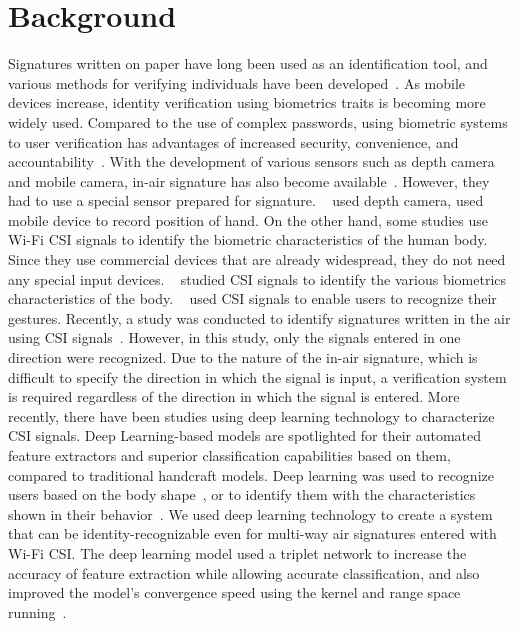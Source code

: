 \section{Background}
Signatures written on paper have long been used as an identification tool, and various methods for verifying individuals have been developed~\cite{fahmy2010online,galbally2015line,sanmorino2012survey,sesa2012information}.
As mobile devices increase, identity verification using biometrics traits is becoming more widely used.
Compared to the use of complex passwords, using biometric systems to user verification has advantages of increased security, convenience, and accountability~\cite{hutton2004biometrics}.
With the development of various sensors such as depth camera and mobile camera, in-air signature has also become available~\cite{bailador2011analysis}. However, they had to use a special sensor prepared for signature. ~\cite{jeon2012system,malik20183dairsig} used depth camera, \cite{ketabdar2012magnetic} used mobile device to record position of hand.
On the other hand, some studies use Wi-Fi CSI signals to identify the biometric characteristics of the human body. Since they use commercial devices that are already widespread, they do not need any special input devices.
~\cite{hong2016wfid,liu2015tracking,yousefi2017survey} studied CSI signals to identify the various biometrics characteristics of the body. ~\cite{abdelnasser2015wigest,nandakumar2014wi} used CSI signals to enable users to recognize their gestures.
Recently, a study was conducted to identify signatures written in the air using CSI signals~\cite{moon2017air}. However, in this study, only the signals entered in one direction were recognized. Due to the nature of the in-air signature, which is difficult to specify the direction in which the signal is input, a verification system is required regardless of the direction in which the signal is entered.
More recently, there have been studies using deep learning technology to characterize CSI signals. Deep Learning-based models are spotlighted for their automated feature extractors and superior classification capabilities based on them, compared to traditional handcraft models. Deep learning was used to recognize users based on the body shape~\cite{pokkunuru2018neuralwave}, or to identify them with the characteristics shown in their behavior~\cite{shi2017smart}.
We used deep learning technology to create a system that can be identity-recognizable even for multi-way air signatures entered with Wi-Fi CSI.
The deep learning model used a triplet network to increase the accuracy of feature extraction while allowing accurate classification, and also improved the model's convergence speed using the kernel and range space running~\cite{toh2018gradient}.

